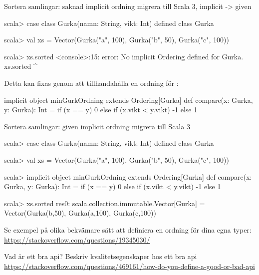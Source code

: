 \begin{Slide}{Sortera samlingar: saknad implicit ordning}
\TODO migrera till Scala 3, implicit -> given
\begin{REPL}
scala> case class Gurka(namn: String, vikt: Int)
defined class Gurka

scala> val xs = Vector(Gurka("a", 100), Gurka("b", 50), Gurka("c", 100))

scala> xs.sorted
<console>:15: error: No implicit Ordering defined for Gurka.
       xs.sorted
          ^
\end{REPL}
\pause
Detta kan fixas genom att tillhandahålla en  ordning för :
\begin{Code}
implicit object minGurkOrdning extends Ordering[Gurka] {
  def compare(x: Gurka, y: Gurka): Int =
    if (x == y) 0
    else if (x.vikt < y.vikt) -1
    else 1
}
\end{Code}
\end{Slide}


\begin{Slide}{Sortera samlingar: given implicit ordning}
\TODO migrera till Scala 3

\begin{REPL}
scala> case class Gurka(namn: String, vikt: Int)
defined class Gurka

scala> val xs = Vector(Gurka("a", 100), Gurka("b", 50), Gurka("c", 100))

scala> implicit object minGurkOrdning extends Ordering[Gurka] {
         def compare(x: Gurka, y: Gurka): Int =
           if (x == y) 0
           else if (x.vikt < y.vikt) -1
           else 1
       }

scala> xs.sorted
res0: scala.collection.immutable.Vector[Gurka] =
        Vector(Gurka(b,50), Gurka(a,100), Gurka(c,100))
\end{REPL}
{\SlideFontTiny Se exempel på olika bekvämare sätt att definiera en ordning för dina egna typer: \\
\url{https://stackoverflow.com/questions/19345030/}}
\end{Slide}


\begin{Slide}{Vad är ett bra api?}
\TODO Beskriv kvalitetsegenskaper hos ett bra api\\
\href{https://stackoverflow.com/questions/469161/how-do-you-define-a-good-or-bad-api}{https://stackoverflow.com/questions/469161/how-do-you-define-a-good-or-bad-api}  
\end{Slide}

